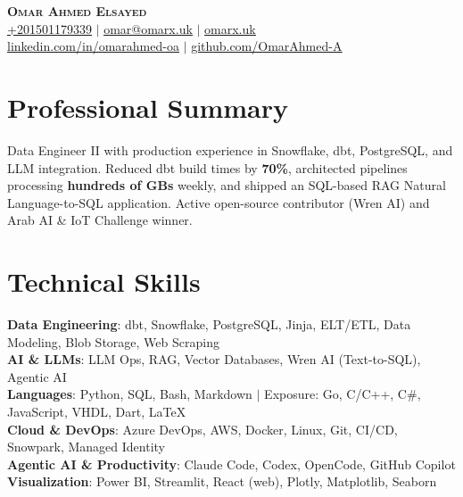 \documentclass{article}
\begin{document}
\begin{center}
  \textbf{\Huge \sectionfont \scshape Omar Ahmed Elsayed} \\ \vspace{1pt}
  \small \href{tel:+201501179339}{\underline{+201501179339}} $|$ \href{mailto:omar@omarx.uk}{\underline{omar@omarx.uk}} $|$ \href{https://omarx.uk}{\underline{omarx.uk}}\\
  \smallskip
  \href{https://www.linkedin.com/in/omarahmed-oa/}{\underline{linkedin.com/in/omarahmed-oa}} $|$
  \href{https://github.com/OmarAhmed-A}{\underline{github.com/OmarAhmed-A}}
\end{center}

\section{Professional Summary}
\begin{itemize}[leftmargin=0.15in, label={}]
  \small{\item{
    Data Engineer II with production experience in Snowflake, dbt, PostgreSQL, and LLM integration. Reduced dbt build times by \textbf{70\%}, architected pipelines processing \textbf{hundreds of GBs} weekly, and shipped an SQL-based RAG Natural Language-to-SQL application. Active open-source contributor (Wren AI) and Arab AI \& IoT Challenge winner.
    }}
\end{itemize}

\section{Technical Skills}
\begin{itemize}[leftmargin=0.15in, label={}]
  \small{\item{
        \textbf{Data Engineering}{: dbt, Snowflake, PostgreSQL, Jinja, ELT/ETL, Data Modeling, Blob Storage, Web Scraping} \\
        \textbf{AI \& LLMs}{: LLM Ops, RAG, Vector Databases, Wren AI (Text-to-SQL), Agentic AI} \\
        \textbf{Languages}{: Python, SQL, Bash, Markdown $|$ Exposure: Go, C/C++, C\#, JavaScript, VHDL, Dart, LaTeX} \\
        \textbf{Cloud \& DevOps}{: Azure DevOps, AWS, Docker, Linux, Git, CI/CD, Snowpark, Managed Identity} \\
        \textbf{Agentic AI \& Productivity}{: Claude Code, Codex, OpenCode, GitHub Copilot}\\
        \textbf{Visualization}{: Power BI, Streamlit, React (web), Plotly, Matplotlib, Seaborn}
        }}
\end{itemize}
\end{document}
